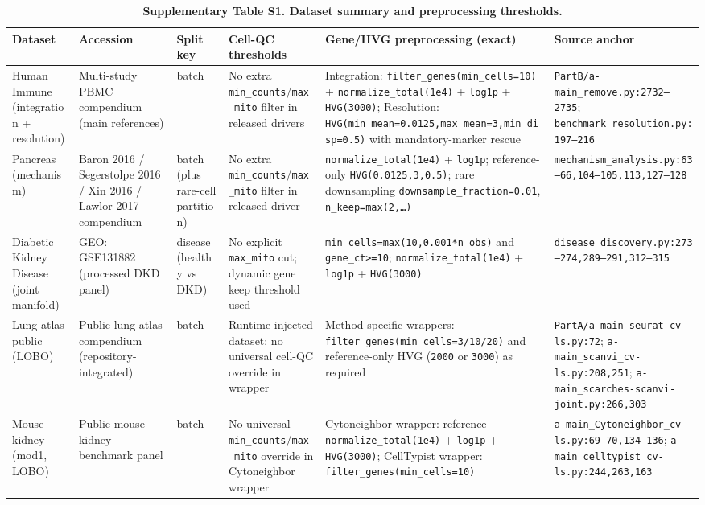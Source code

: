 \documentclass[11pt]{article}
\begin{document}
\begin{table}[htbp]
\centering
\caption{\textbf{Supplementary Table S1. Dataset summary and preprocessing thresholds.}}
\label{tab:s1_dataset_summary}
\renewcommand{\arraystretch}{1.2}
\scriptsize
\begin{tabular}{p{} p{} p{} p{} p{} p{}}
\toprule
\textbf{Dataset} & \textbf{Accession} & \textbf{Split key} & \textbf{Cell-QC thresholds} & \textbf{Gene/HVG preprocessing (exact)} & \textbf{Source anchor} \\
\midrule
Human Immune (integration + resolution) & Multi-study PBMC compendium (main references) & batch & No extra \texttt{min\_counts}/\texttt{max\_mito} filter in released drivers & Integration: \texttt{filter\_genes(min\_cells=10)} + \texttt{normalize\_total(1e4)} + \texttt{log1p} + \texttt{HVG(3000)}; Resolution: \texttt{HVG(min\_mean=0.0125,max\_mean=3,min\_disp=0.5)} with mandatory-marker rescue & \texttt{PartB/a-main\_remove.py:2732--2735}; \texttt{benchmark\_resolution.py:197--216} \\
Pancreas (mechanism) & Baron 2016 / Segerstolpe 2016 / Xin 2016 / Lawlor 2017 compendium & batch (plus rare-cell partition) & No extra \texttt{min\_counts}/\texttt{max\_mito} filter in released driver & \texttt{normalize\_total(1e4)} + \texttt{log1p}; reference-only \texttt{HVG(0.0125,3,0.5)}; rare downsampling \texttt{downsample\_fraction=0.01}, \texttt{n\_keep=max(2,\dots)} & \texttt{mechanism\_analysis.py:63--66,104--105,113,127--128} \\
Diabetic Kidney Disease (joint manifold) & GEO: GSE131882 (processed DKD panel) & disease (healthy vs DKD) & No explicit \texttt{max\_mito} cut; dynamic gene keep threshold used & \texttt{min\_cells=max(10,0.001*n\_obs)} and \texttt{gene\_ct>=10}; \texttt{normalize\_total(1e4)} + \texttt{log1p} + \texttt{HVG(3000)} & \texttt{disease\_discovery.py:273--274,289--291,312--315} \\
Lung atlas public (LOBO) & Public lung atlas compendium (repository-integrated) & batch & Runtime-injected dataset; no universal cell-QC override in wrapper & Method-specific wrappers: \texttt{filter\_genes(min\_cells=3/10/20)} and reference-only HVG (\texttt{2000} or \texttt{3000}) as required & \texttt{PartA/a-main\_seurat\_cv-ls.py:72}; \texttt{a-main\_scanvi\_cv-ls.py:208,251}; \texttt{a-main\_scarches-scanvi-joint.py:266,303} \\
Mouse kidney (mod1, LOBO) & Public mouse kidney benchmark panel & batch & No universal \texttt{min\_counts}/\texttt{max\_mito} override in Cytoneighbor wrapper & Cytoneighbor wrapper: reference \texttt{normalize\_total(1e4)} + \texttt{log1p} + \texttt{HVG(3000)}; CellTypist wrapper: \texttt{filter\_genes(min\_cells=10)} & \texttt{a-main\_Cytoneighbor\_cv-ls.py:69--70,134--136}; \texttt{a-main\_celltypist\_cv-ls.py:244,263,163} \\

\end{tabular}
\end{table}
\end{document}
